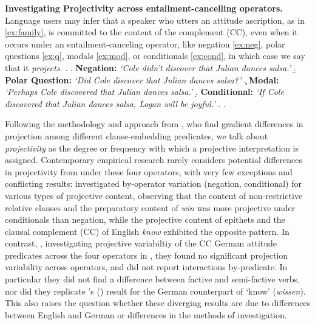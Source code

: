 \documentclass[12pt, letterpaper]{article}
\newcommand{\posscite}[1]{\citeauthor{#1}'s (\citeyear{#1})}
\begin{document}
\noindent
	{\bf Investigating Projectivity across entailment-cancelling operators.} Language users may infer that a speaker who utters an attitude ascription, as in \ref{ex:family}, is committed to the content of the complement (CC),
	even when it occurs under an entailment-canceling operator, like negation \ref{ex:neg}, polar questions \ref{ex:q}, modals \ref{ex:mod}, or conditionals \ref{ex:cond}, in which case we say that it \emph{projects}.
	\ex. \label{ex:family}
		\a. \label{ex:neg}
			{\bf Negation:} \hfill
			\emph{\lq Cole didn't discover that Julian dances salsa.\rq}
		\b. \label{ex:q}
			{\bf Polar Question:} \hfill
			\emph{\lq Did Cole discover that Julian dances salsa?\rq}
		\c. \label{ex:mod}
			{\bf Modal:} \hfill
			\emph{\lq Perhaps Cole discovered that Julian dances salsa.\rq}
		\d. \label{ex:cond}
			{\bf Conditional:} \hfill
			\emph{\lq If Cole discovered that Julian dances salsa, Logan will be joyful.\rq}
		\z.
	\z.


	\noindent Following the methodology and approach from \citet{tonhauser_how_2018,degen_are_2022}, who find gradient differences in projection among different clause-embedding predicates, we talk about \emph{projectivity} as the degree or frequency with which a projective interpretation is assigned. 
%
	Contemporary empirical research rarely considers potential differences in projectivity from under these four operators, with very few exceptions and conflicting results: \citet{smith_relationship_2014} investigated by-operator variation (negation, conditional) for various types of projective content, observing that the content of non-restrictive relative clauses and the preparatory content of \emph{win} was more projective under conditionals than negation, while the projective content of epithets and the clausal complement (CC) of English \emph{know} exhibited the opposite pattern. In contrast, \citet{sieker_projective_2022}, investigating projective variabiltiy of the CC German attitude predicates across the four operators in \Last, they found no significant projection variability across operators, and did not report interactions by-predicate. In particular they did not find a difference between factive and semi-factive verbs, nor did they replicate \posscite{smith_relationship_2014} result for the German counterpart of `know' (\emph{wissen}). This also raises the question whether these diverging results are due to differences between English and German or differences in the methods of investigation.
\end{document}
